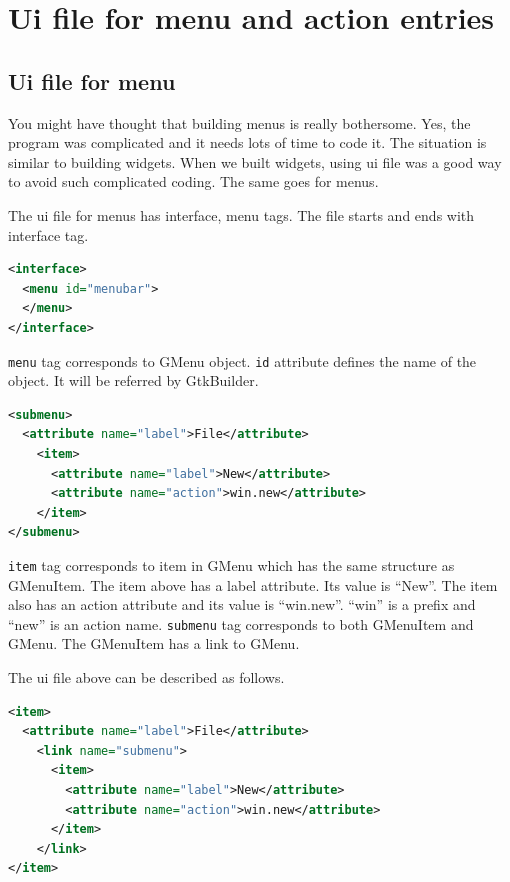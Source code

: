 \hypertarget{ui-file-for-menu-and-action-entries}{%
\section{Ui file for menu and action
entries}\label{ui-file-for-menu-and-action-entries}}

\hypertarget{ui-file-for-menu}{%
\subsection{Ui file for menu}\label{ui-file-for-menu}}

You might have thought that building menus is really bothersome. Yes,
the program was complicated and it needs lots of time to code it. The
situation is similar to building widgets. When we built widgets, using
ui file was a good way to avoid such complicated coding. The same goes
for menus.

The ui file for menus has interface, menu tags. The file starts and ends
with interface tag.

\begin{lstlisting}[language=XML]
<interface>
  <menu id="menubar">
  </menu>
</interface>
\end{lstlisting}

\passthrough{\lstinline!menu!} tag corresponds to GMenu object.
\passthrough{\lstinline!id!} attribute defines the name of the object.
It will be referred by GtkBuilder.

\begin{lstlisting}[language=XML]
<submenu>
  <attribute name="label">File</attribute>
    <item>
      <attribute name="label">New</attribute>
      <attribute name="action">win.new</attribute>
    </item>
</submenu>
\end{lstlisting}

\passthrough{\lstinline!item!} tag corresponds to item in GMenu which
has the same structure as GMenuItem. The item above has a label
attribute. Its value is ``New''. The item also has an action attribute
and its value is ``win.new''. ``win'' is a prefix and ``new'' is an
action name. \passthrough{\lstinline!submenu!} tag corresponds to both
GMenuItem and GMenu. The GMenuItem has a link to GMenu.

The ui file above can be described as follows.

\begin{lstlisting}[language=XML]
<item>
  <attribute name="label">File</attribute>
    <link name="submenu">
      <item>
        <attribute name="label">New</attribute>
        <attribute name="action">win.new</attribute>
      </item>
    </link>
</item>
\end{lstlisting}

